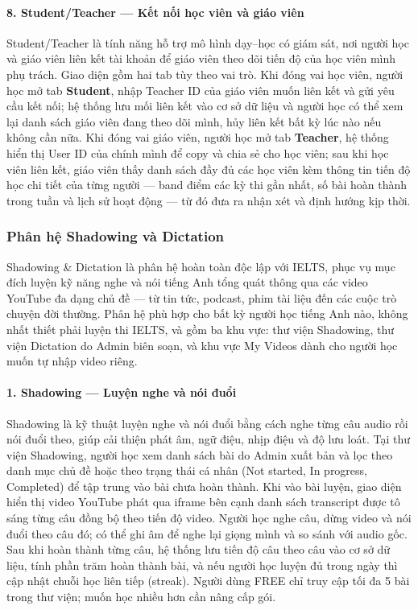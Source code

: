 \paragraph{8. Student/Teacher --- Kết nối học viên và giáo viên}

Student/Teacher là tính năng hỗ trợ mô hình dạy--học có giám sát, nơi người học và giáo viên liên kết tài khoản để giáo viên theo dõi tiến độ của học viên mình phụ trách. Giao diện gồm hai tab tùy theo vai trò. Khi đóng vai học viên, người học mở tab \textbf{Student}, nhập Teacher ID của giáo viên muốn liên kết và gửi yêu cầu kết nối; hệ thống lưu mối liên kết vào cơ sở dữ liệu và người học có thể xem lại danh sách giáo viên đang theo dõi mình, hủy liên kết bất kỳ lúc nào nếu không cần nữa. Khi đóng vai giáo viên, người học mở tab \textbf{Teacher}, hệ thống hiển thị User ID của chính mình để copy và chia sẻ cho học viên; sau khi học viên liên kết, giáo viên thấy danh sách đầy đủ các học viên kèm thông tin tiến độ học chi tiết của từng người --- band điểm các kỳ thi gần nhất, số bài hoàn thành trong tuần và lịch sử hoạt động --- từ đó đưa ra nhận xét và định hướng kịp thời.

\subsubsection{Phân hệ Shadowing và Dictation}

Shadowing \& Dictation là phân hệ hoàn toàn độc lập với IELTS, phục vụ mục đích luyện kỹ năng nghe và nói tiếng Anh tổng quát thông qua các video YouTube đa dạng chủ đề --- từ tin tức, podcast, phim tài liệu đến các cuộc trò chuyện đời thường. Phân hệ phù hợp cho bất kỳ người học tiếng Anh nào, không nhất thiết phải luyện thi IELTS, và gồm ba khu vực: thư viện Shadowing, thư viện Dictation do Admin biên soạn, và khu vực My Videos dành cho người học muốn tự nhập video riêng.

\paragraph{1. Shadowing --- Luyện nghe và nói đuổi}

Shadowing là kỹ thuật luyện nghe và nói đuổi bằng cách nghe từng câu audio rồi nói đuổi theo, giúp cải thiện phát âm, ngữ điệu, nhịp điệu và độ lưu loát. Tại thư viện Shadowing, người học xem danh sách bài do Admin xuất bản và lọc theo danh mục chủ đề hoặc theo trạng thái cá nhân (Not started, In progress, Completed) để tập trung vào bài chưa hoàn thành. Khi vào bài luyện, giao diện hiển thị video YouTube phát qua iframe bên cạnh danh sách transcript được tô sáng từng câu đồng bộ theo tiến độ video. Người học nghe câu, dừng video và nói đuổi theo câu đó; có thể ghi âm để nghe lại giọng mình và so sánh với audio gốc. Sau khi hoàn thành từng câu, hệ thống lưu tiến độ câu theo câu vào cơ sở dữ liệu, tính phần trăm hoàn thành bài, và nếu người học luyện đủ trong ngày thì cập nhật chuỗi học liên tiếp (streak). Người dùng FREE chỉ truy cập tối đa 5 bài trong thư viện; muốn học nhiều hơn cần nâng cấp gói.

